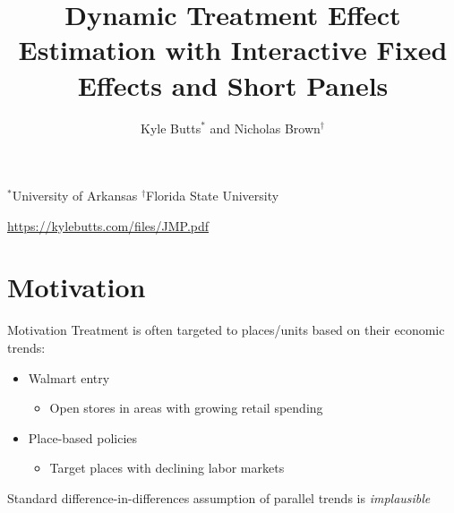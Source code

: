 \documentclass[aspectratio=169,t,11pt]{beamer}
\title{Dynamic Treatment Effect Estimation with Interactive Fixed Effects and Short Panels}
\author{\texorpdfstring{Kyle Butts$^*$ and Nicholas Brown$^{\dagger}$}{Kyle Butts and Nicholas Brown}}
\begin{document}
\begin{frame}[plain]
  \maketitle

  {\footnotesize\color{zinc600}
    $^*$University of Arkansas\hspace{2mm}
    $^\dagger$Florida State University
  } 
  
  \vspace{20mm}
  {\footnotesize \url{https://kylebutts.com/files/JMP.pdf}}
\end{frame}

\section{Motivation}

\begin{frame}{Motivation}
  Treatment is often targeted to places/units based on their economic trends:

  \begin{itemize}    

    \pause
    \item Walmart entry 
    \begin{itemize}
      \item Open stores in areas with growing retail spending
    \end{itemize}

    \pause
    \item Place-based policies 
    \begin{itemize}
      \item Target places with declining labor markets 
    \end{itemize}
  \end{itemize}

  \bigskip\pause
  Standard difference-in-differences assumption of parallel trends is \emph{implausible}
\end{frame}
\end{document}
